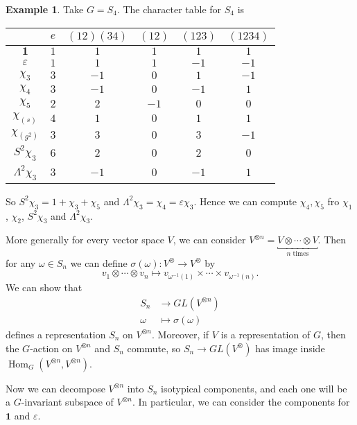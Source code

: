 \documentclass[12pt]{article}
\DeclareMathOperator{\Hom}{Hom}
\theoremstyle{definition}
\newtheorem{example}{Example}[section]
\theoremstyle{remark}
\begin{document}
\begin{adjustbox}{minipage = \columnwidth - 25.5pt, margin=1em, frame=1pt, margin=0em}
\begin{example}
	Take $G = S_4$. The character table for $S_4$ is

\begin{center}
\begin{tabular}{c|ccccc}
		& $e$ & $(12)(34)$ & $(12)$ & $(123)$ & $(1234)$ \\
			  \hline
	$\mathbf{1}$ & $1$ & $1$ & $1$ & $1$ & $1$ \\
	$\varepsilon$ & $1$ & $1$ & $1$ & $-1$ & $-1$ \\
	$\chi_{3}$ & $3$ & $-1$ & $0$ & $1$ & $-1$\\
	$\chi_4$ & $3$ & $-1$ & $0$ & $-1$ & $1$ \\
	$\chi_5$ & $2$ & $2$ & $-1$ & $0$ & $0$ \\
	\hline
	$\chi_(s)$ & $4$ & $1$ & $0$ & $1$ & $1$ \\
	$\chi_{(g^2)}$ & $3$ & $3$ & $0$ & $3$ & $-1$ \\
	$S^2\chi_3$ & $6$ & $2$ & $0$ & $2$ & $0$ \\
	$\Lambda^2\chi_3$ & $3$ & $-1$ & $0$ & $-1$ & $1$
\end{tabular}
\end{center}
So $S^2\chi_3 = 1 + \chi_3 + \chi_5$ and $\Lambda^2 \chi_3 = \chi_4 = \varepsilon \chi_3$. Hence we can compute $\chi_4, \chi_5$ fro $\chi_1$, $\chi_2$, $S^2 \chi_3$ and $\Lambda^2 \chi_3$.
\end{example}
\end{adjustbox}

More generally for every vector space $V$, we can consider $V^{\otimes n} = \underbracket{V \otimes \cdots \otimes V}_{n \text{ times}}$. Then for any $\omega \in S_n$ we can define $\sigma(\omega) : V^{\otimes} \to V^{\otimes}$ by
\[
	v_1 \otimes \cdots \otimes v_n \mapsto v_{\omega^{-1}(1)} \times \cdots \times v_{\omega^{-1}(n)}
.\]
We can show that
\begin{align*}
	S_n &\to GL(V^{\otimes n}) \\
	\omega &\mapsto \sigma(\omega)
\end{align*}
defines a representation $S_n$ on $V^{\otimes n}$. Moreover, if $V$ is a representation of $G$, then the $G$-action on $V^{\otimes n}$ and $S_n$ commute, so $S_n \to GL(V^{\otimes})$ has image inside $\Hom_G(V^{\otimes n}, V^{\otimes n})$.

Now we can decompose $V^{\otimes n}$ into $S_n$ isotypical components, and each one will be a $G$-invariant subspace of $V^{\otimes n}$. In particular, we can consider the components for $\mathbf{1}$ and $\varepsilon$.
\end{document}
